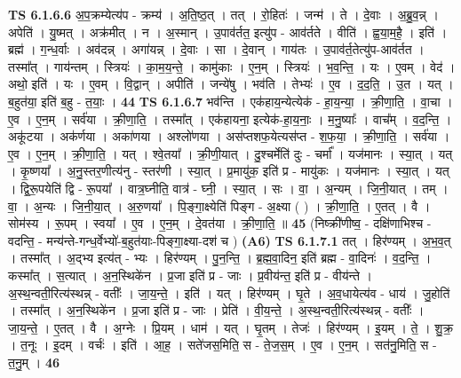 \documentclass[17pt]{extarticle}
\begin{document}
                  \newline
                                \textbf{ TS 6.1.6.6} \newline
                  अ॒प॒क्रम्येत्य॑प - क्रम्य॑ । अ॒ति॒ष्ठ॒त् । तत् । रो॒हितः॑ । जन्म॑ । ते । दे॒वाः । अ॒ब्रु॒व॒न्न् । अपेति॑ । यु॒ष्मत् । अक्र॑मीत् । न । अ॒स्मान् । उ॒पाव॑र्तत॒ इत्यु॑प - आव॑र्तते । वीति॑ । ह्व॒या॒म॒है॒ । इति॑ । ब्रह्म॑ । ग॒न्ध॒र्वाः । अव॑दन्न् । अगा॑यन्न् । दे॒वाः । सा । दे॒वान् । गाय॑तः । उ॒पाव॑र्त॒तेत्यु॑प-आव॑र्तत । तस्मा᳚त् । गाय॑न्तम् । स्त्रियः॑ । का॒म॒य॒न्ते॒ । कामु॑काः । ए॒न॒म् । स्त्रियः॑ । भ॒व॒न्ति॒ । यः । ए॒वम् । वेद॑ । अथो॒ इति॑ । यः । ए॒वम् । वि॒द्वान् । अपीति॑ । जन्ये॑षु । भव॑ति । तेभ्यः॑ । ए॒व । द॒द॒ति॒ । उ॒त । यत् । ब॒हुत॑या॒ इति॑ ब॒हु - त॒याः॒ । \textbf{  44} \newline
                  \newline
                                \textbf{ TS 6.1.6.7} \newline
                  भव॑न्ति । एक॑हाय॒न्येत्येक॑ - हा॒य॒न्या॒ । क्री॒णा॒ति॒ । वा॒चा । ए॒व । ए॒न॒म् । सर्व॑या । क्री॒णा॒ति॒ । तस्मा᳚त् । एक॑हायना॒ इत्येक॑-हा॒य॒नाः॒ । म॒नु॒ष्याः᳚ । वाच᳚म् । व॒द॒न्ति॒ । अकू॑टया । अक॑र्णया । अका॑णया । अश्लो॑णया । अस॑प्तशफ॒येत्यस॑प्त - श॒फ॒या॒ । क्री॒णा॒ति॒ । सर्व॑या । ए॒व । ए॒न॒म् । क्री॒णा॒ति॒ । यत् । श्वे॒तया᳚ । क्री॒णी॒यात् । दु॒श्चर्मेति॑ दुः - चर्मा᳚ । यज॑मानः । स्या॒त् । यत् । कृ॒ष्णया᳚ । अ॒नु॒स्तर॒णीत्य॑नु - स्तर॑णी । स्या॒त् । प्र॒मायु॑क॒ इति॑ प्र - मायु॑कः । यज॑मानः । स्या॒त् । यत् । द्वि॒रू॒पयेति॑ द्वि - रू॒पया᳚ । वात्र॒घ्नीति॒ वात्र॑ - घ्नी॒ । स्या॒त् । सः । वा॒ । अ॒न्यम् । जि॒नी॒यात् । तम् । वा॒ । अ॒न्यः । जि॒नी॒या॒त् । अ॒रु॒णया᳚ । पि॒ङ्गा॒क्ष्येति॑ पिङ्ग - अ॒क्ष्या ( ) । क्री॒णा॒ति॒ । ए॒तत् । वै । सोम॑स्य । रू॒पम् । स्वया᳚ । ए॒व । ए॒न॒म् । दे॒वत॑या । क्री॒णा॒ति॒ ॥ \textbf{  45 } \newline
                  \newline
                      (निष्क्री॑णीष्व॒ - दक्षि॑णाभिश्च - वदन्ति॒ - मन्य॑न्ते-गन्ध॒र्वेभ्यो॑-ब॒हुत॑याः-पिङ्गा॒क्ष्या-दश॑ च )  \textbf{(A6)} \newline \newline
                                \textbf{ TS 6.1.7.1} \newline
                  तत् । हिर॑ण्यम् । अ॒भ॒व॒त् । तस्मा᳚त् । अ॒द्भ्य इत्य॑त् - भ्यः । हिर॑ण्यम् । पु॒न॒न्ति॒ । ब्र॒ह्म॒वा॒दिन॒ इति॑ ब्रह्म - वा॒दिनः॑ । व॒द॒न्ति॒ । कस्मा᳚त् । स॒त्यात् । अ॒न॒स्थिके॑न । प्र॒जा इति॑ प्र - जाः । प्र॒वीय॑न्त॒ इति॑ प्र - वीय॑न्ते । अ॒स्थ॒न्वती॒रित्य॑स्थन्न् - वतीः᳚ । जा॒य॒न्ते॒ । इति॑ । यत् । हिर॑ण्यम् । घृ॒ते । अ॒व॒धायेत्य॑व - धाय॑ । जु॒होति॑ । तस्मा᳚त् । अ॒न॒स्थिके॑न । प्र॒जा इति॑ प्र - जाः । प्रेति॑ । वी॒य॒न्ते॒ । अ॒स्थ॒न्वती॒रित्य॑स्थन्न् - वतीः᳚ । जा॒य॒न्ते॒ । ए॒तत् । वै । अ॒ग्नेः । प्रि॒यम् । धाम॑ । यत् । घृ॒तम् । तेजः॑ । हिर॑ण्यम् । इ॒यम् । ते॒ । शु॒क्र॒ । त॒नूः । इ॒दम् । वर्चः॑ । इति॑ । आ॒ह॒ । सते॑जस॒मिति॒ स - ते॒ज॒स॒म् । ए॒व । ए॒न॒म् । सत॑नु॒मिति॒ स - त॒नु॒म् । \textbf{  46} \newline
\end{document}
